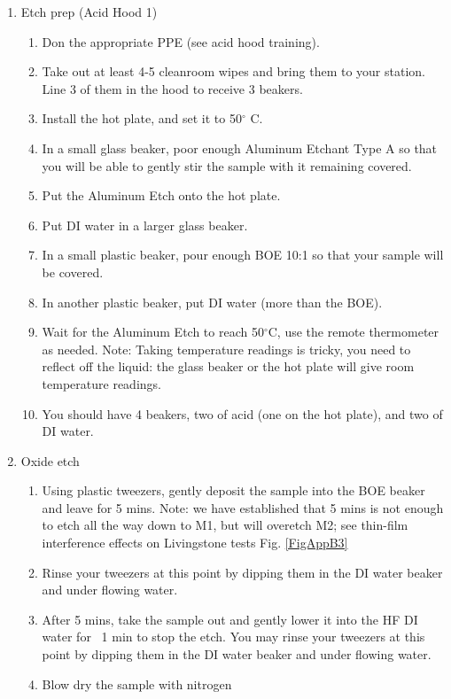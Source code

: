 \begin{enumerate}
    \item Etch prep (Acid Hood 1) 
    \begin{enumerate}
        \item Don the appropriate PPE (see acid hood training). 
        \item Take out at least 4-5 cleanroom wipes and bring them to your station. Line 3 of them in the hood to receive 3 beakers.
        \item Install the hot plate, and set it to 50$^\circ$ C. 
        \item In a small glass beaker, poor enough Aluminum Etchant Type A so that you will be able to gently stir the sample with it remaining covered. 
        \item Put the Aluminum Etch onto the hot plate.
        \item Put DI water in a larger glass beaker. 
        \item In a small plastic beaker, pour enough BOE 10:1 so that your sample will be covered.
        \item In another plastic beaker, put DI water (more than the BOE).
        \item Wait for the Aluminum Etch to reach 50$^\circ$C, use the remote thermometer as needed. Note: Taking temperature readings is tricky, you need to reflect off the liquid: the glass beaker or the hot plate will give room temperature readings. 
        \item You should have 4 beakers, two of acid (one on the hot plate), and two of DI water.
    \end{enumerate}
    \item Oxide etch
    \begin{enumerate}
        \item Using plastic tweezers, gently deposit the sample into the BOE beaker and leave for 5 mins. Note: we have established that 5 mins is not enough to etch all the way down to M1, but will overetch M2; see thin-film interference effects on Livingstone tests Fig. \ref{FigAppB3}
        \item Rinse your tweezers at this point by dipping them in the DI water beaker and under flowing water.
        \item After 5 mins, take the sample out and gently lower it into the HF DI water for ~1 min to stop the etch. You may rinse your tweezers at this point by dipping them in the DI water beaker and under flowing water.
        \item Blow dry the sample with nitrogen 

\end{enumerate}
\end{enumerate}
